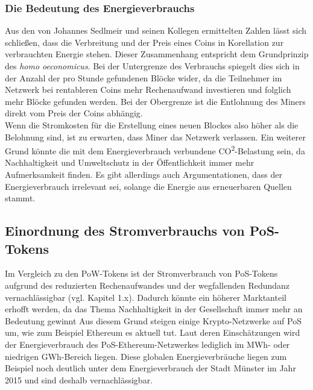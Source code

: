 \documentclass[12pt]{article}
\begin{document}
\subsubsection{Die Bedeutung des Energieverbrauchs}
Aus den von Johannes Sedlmeir und seinen Kollegen ermittelten Zahlen lässt sich schließen, dass die Verbreitung und der Preis eines Coins in Korellation zur verbrauchten Energie stehen. Dieser Zusammenhang entspricht dem Grundprinzip des \textit{homo oeconomicus}. Bei der Untergrenze des Verbrauchs spiegelt dies sich in der Anzahl der pro Stunde gefundenen Blöcke wider, da die Teilnehmer im Netzwerk bei rentableren Coins mehr Rechenaufwand investieren und folglich mehr Blöcke gefunden werden. Bei der Obergrenze ist die Entlohnung des Miners direkt vom Preis der Coins abhängig.\\
Wenn die Stromkosten für die Erstellung eines neuen Blockes also höher als die Belohnung sind, ist zu erwarten, dass Miner das Netzwerk verlassen. Ein weiterer Grund könnte die mit dem Energieverbrauch verbundene CO\textsuperscript{2}-Belastung sein, da Nachhaltigkeit und Umweltschutz in der Öffentlichkeit immer mehr Aufmerksamkeit finden. Es gibt allerdings auch Argumentationen, dass der Energieverbrauch irrelevant sei, solange die Energie aus erneuerbaren Quellen stammt.

\subsection{Einordnung des Stromverbrauchs von PoS-Tokens}
Im Vergleich zu den PoW-Tokens ist der Stromverbrauch von PoS-Tokens aufgrund des reduzierten Rechenaufwandes und der wegfallenden Redundanz vernachlässigbar (vgl. Kapitel 1.x). Dadurch könnte ein höherer Marktanteil erhofft werden, da das Thema Nachhaltigkeit in der Gesellschaft immer mehr an Bedeutung gewinnt Aus diesem Grund steigen einige Krypto-Netzwerke auf PoS um, wie zum Beispiel Ethereum es aktuell tut. Laut deren Einschätzungen wird der Energieverbrauch des PoS-Ethereum-Netzwerkes lediglich im MWh- oder niedrigen GWh-Bereich liegen. Diese globalen Energieverbräuche liegen zum Beispiel noch deutlich unter dem Energieverbrauch der Stadt Münster im Jahr 2015 und sind deshalb vernachlässigbar.
\end{document}
